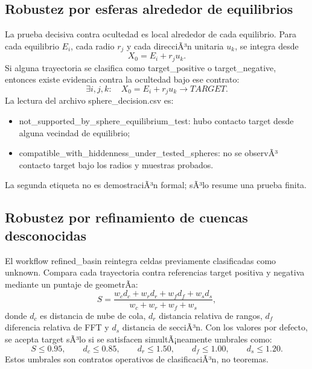 \documentclass[11pt]{article}
\newcommand{\TARGET}{\texttt{TARGET}}
\DeclareRobustCommand{\codepath}[1]{\begingroup\Urlmuskip=0mu plus 2mu\path{#1}\endgroup}
\def\codepath#1{#1}%
\def\TARGET{TARGET}%
\begin{document}
\subsection{Robustez por esferas alrededor de equilibrios}

La prueba decisiva contra ocultedad es local alrededor de cada equilibrio. Para cada equilibrio \(E_i\), cada radio \(r_j\) y cada direcciÃ³n unitaria \(u_k\), se integra desde
\begin{equation}
X_0=E_i+r_j u_k.
\end{equation}
Si alguna trayectoria se clasifica como \codepath{target_positive} o \codepath{target_negative}, entonces existe evidencia contra la ocultedad bajo ese contrato:
\begin{equation}
\exists i,j,k:
\quad X_0=E_i+r_ju_k\longrightarrow \TARGET.
\end{equation}
La lectura del archivo \codepath{sphere_decision.csv} es:
\begin{itemize}
\item \codepath{not_supported_by_sphere_equilibrium_test}: hubo contacto target desde alguna vecindad de equilibrio;
\item \codepath{compatible_with_hiddenness_under_tested_spheres}: no se observÃ³ contacto target bajo los radios y muestras probados.
\end{itemize}
La segunda etiqueta no es demostraciÃ³n formal; sÃ³lo resume una prueba finita.

\subsection{Robustez por refinamiento de cuencas desconocidas}

El workflow \codepath{refined_basin} reintegra celdas previamente clasificadas como \codepath{unknown}. Compara cada trayectoria contra referencias target positiva y negativa mediante un puntaje de geometrÃ­a:
\begin{equation}
S=\frac{w_c d_c+w_r d_r+w_f d_f+w_s d_s}{w_c+w_r+w_f+w_s},
\end{equation}
donde \(d_c\) es distancia de nube de cola, \(d_r\) distancia relativa de rangos, \(d_f\) diferencia relativa de FFT y \(d_s\) distancia de secciÃ³n. Con los valores por defecto, se acepta target sÃ³lo si se satisfacen simultÃ¡neamente umbrales como:
\begin{equation}
S\leq 0.95,
\qquad d_c\leq0.85,
\qquad d_r\leq1.50,
\qquad d_f\leq1.00,
\qquad d_s\leq1.20.
\end{equation}
Estos umbrales son contratos operativos de clasificaciÃ³n, no teoremas.
\end{document}
